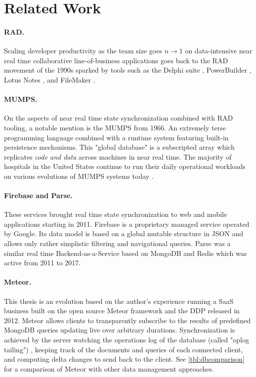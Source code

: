 \cleardoublepage
\section{Related Work}\label{sec:related_work}



\paragraph{\gls{RAD}.} Scaling developer productivity as the team size goes $n \to 1$ on data-intensive near real time collaborative line-of-business applications goes back to the \gls{RAD} movement of the 1990s sparked by tools such as the Delphi suite \cite{mackay2000reconfiguring}, PowerBuilder \cite{zubeck1997implementing}, Lotus Notes \cite{zubeck1997implementing}, and FileMaker
\cite{chen2010developing}.

\paragraph{MUMPS.} On the aspects of near real time state synchronization combined with RAD tooling, a notable mention is the \gls{MUMPS} \cite{bowie1979methods} from 1966. An extremely terse programming language combined with a runtime system featuring built-in persistence mechanisms. This "global database" is a subscripted array which replicates \emph{code and data} across machines in near real time. The majority of hospitals in the United States continue to run their daily operational workloads on various evolutions of MUMPS systems today \cite{aller2018evolution}.

\paragraph{Firebase and Parse.} These services brought real time state synchronization to web and mobile applications starting in 2011. Firebase is a proprietary managed service operated by Google. Its data model is based on a global mutable structure in \gls{JSON} and allows only rather simplistic filtering and navigational queries. Parse was a similar real time Backend-as-a-Service based on MongoDB and Redis which was active from 2011 to 2017. \cite{wingerath2019real}

\paragraph{Meteor.} This thesis is an evolution based on the author's experience running a \gls{SaaS} business built on the open source Meteor \cite{schmidt2014live} framework and the \gls{DDP} \cite{ddpspec} released in 2012. Meteor allows clients to transparently subscribe to the results of predefined MongoDB queries updating live over arbitrary durations. Synchronization is achieved by the server watching the operations log of the database (called "oplog tailing") \cite{wingerath2019real}, keeping track of the documents and queries of each connected client, and computing delta changes to send back to the client. See \autoref{tbl:dbcomparison} for a comparison of Meteor with other data management approaches.

